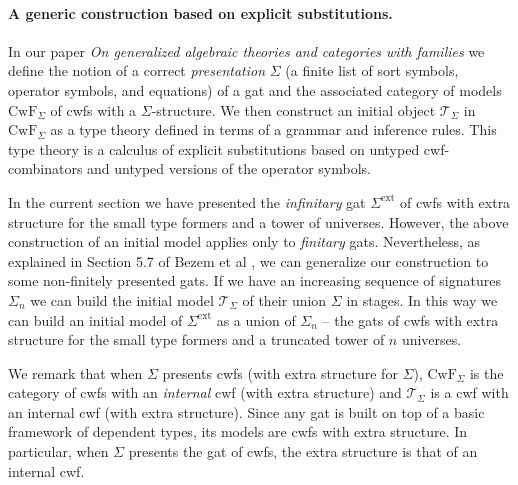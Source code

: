 \documentclass[11pt,a4paper]{article}
\theoremstyle{definition}
\newcommand{\T}{\mathsf{T}}
\def\p{\mathrm{p}}
\def\q{\mathrm{q}}
\def\T{\mathcal{T}}
\def\CwF{\mathrm{CwF}}
\def\Sigmaext{\Sigma^\mathrm{ext}}
\begin{document}
\paragraph{A generic construction based on explicit substitutions.} In our paper {\em On generalized algebraic theories and categories with families} \cite{bezem:hofmann} we define the notion of a correct {\em presentation} $\Sigma$ (a finite list of sort symbols, operator symbols, and equations) of a gat and the associated category of models $\CwF_\Sigma$ of cwfs with a $\Sigma$-structure. We then construct an initial object $\T_\Sigma$ in $\CwF_\Sigma$ as a type theory defined in terms of a grammar and inference rules. This type theory is a calculus of explicit substitutions based on untyped cwf-combinators and untyped versions of the operator symbols. 

In the current section we have presented the {\em infinitary} gat $\Sigmaext$ of cwfs with extra structure for the small type formers and a tower of universes. However, the above construction of an initial model applies only to {\em finitary} gats. Nevertheless, as explained in Section 5.7 of Bezem et al  \cite{bezem:hofmann}, we can generalize our construction to some non-finitely presented gats. If we have an increasing sequence of signatures $\Sigma_n$ we can build the initial model $\T_\Sigma$ of their union $\Sigma$ in stages. In this way we can build an initial model of $\Sigmaext$ as a union of $\Sigma_n$ -- the gats of cwfs with extra structure for the small type formers and a truncated tower of $n$ universes. 

We remark that when $\Sigma$ presents cwfs (with extra structure for $\Sigma$), $\CwF_\Sigma$ is the category of cwfs with an {\em internal} cwf (with extra structure) and $\T_\Sigma$ is a cwf with an internal cwf (with extra structure). Since any gat is built on top of a basic framework of dependent types, its models are cwfs with extra structure. In particular, when $\Sigma$ presents the gat of cwfs, the extra structure is that of an internal cwf.

\end{document}
